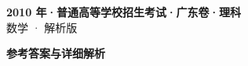 \documentclass[zihao=-4, a4paper]{ctexart}
\begin{document}
\begin{center}
  {\Large\bfseries 2010 年·普通高等学校招生考试·广东卷·理科}\\[4pt]
  {\large 数学 · 解析版}
\end{center}
\medskip
{}

\clearpage
{}
\begin{center}{\Large\bfseries 参考答案与详细解析}\end{center}
\medskip

\end{document}
